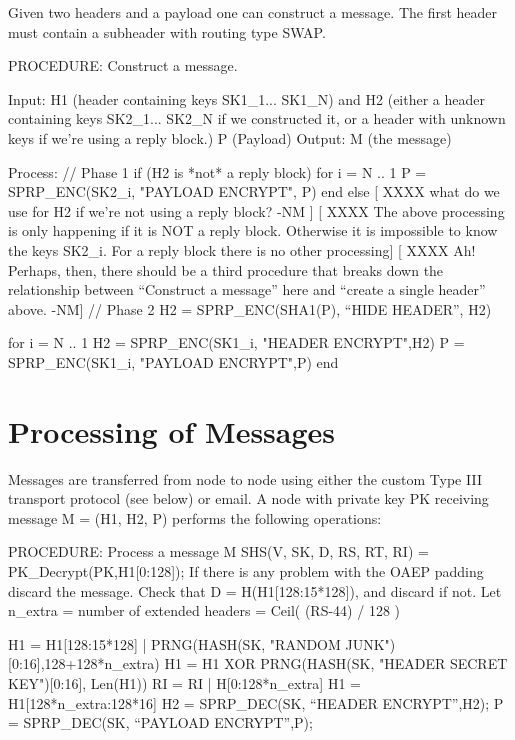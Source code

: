Given two headers and a payload one can construct a
message. The first header must contain a subheader
with routing type SWAP.  

PROCEDURE: Construct a message.

Input: H1 (header containing keys SK1_1... SK1_N)
       and H2 (either a header containing keys SK2_1... SK2_N if
         we constructed it, or a header with unknown keys if we're
         using a reply block.)
       P (Payload)
Output: M (the message)

Process:
	// Phase 1
	if (H2 is *not* a reply block)
		for i = N .. 1
	            P = SPRP_ENC(SK2_i, "PAYLOAD ENCRYPT", P)
		end
        else
           [ XXXX what do we use for H2 if we're not using a reply
	           block? -NM ]
	   [ XXXX The above processing is only happening if it is NOT
	a reply block. Otherwise it is impossible to know the keys
	SK2_i. For a reply block there is no other processing]
           [ XXXX Ah!  Perhaps, then, there should be a third
	          procedure that breaks down the relationship between
                  ``Construct a message'' here and ``create a single header''
                  above. -NM]
	// Phase 2
	H2 = SPRP_ENC(SHA1(P), ``HIDE HEADER'', H2)

	for i = N .. 1
		H2 = SPRP_ENC(SK1_i, "HEADER ENCRYPT",H2)
		P = SPRP_ENC(SK1_i, "PAYLOAD ENCRYPT",P)
	end

\section{Processing of Messages}

Messages are transferred from node to node using either the custom Type
III transport protocol (see below) or email.  A node with private key
PK receiving message M = (H1, H2, P) performs the following operations:

PROCEDURE: Process a message M
	SHS(V, SK, D, RS, RT, RI) = PK_Decrypt(PK,H1[0:128]);
        If there is any problem with the OAEP padding discard the message.
        Check that D = H(H1[128:15*128]), and discard if not.
        Let n_extra = number of extended headers = Ceil( (RS-44) / 128 )
                  
        H1 = H1[128:15*128] | PRNG(HASH(SK, "RANDOM 
                                               JUNK")[0:16],128+128*n_extra)
	H1 = H1 XOR PRNG(HASH(SK, "HEADER SECRET KEY")[0:16], Len(H1))
        RI = RI | H[0:128*n_extra]
        H1 = H1[128*n_extra:128*16]
	H2 = SPRP_DEC(SK, ``HEADER ENCRYPT'',H2);
	P = SPRP_DEC(SK, ``PAYLOAD ENCRYPT'',P);

